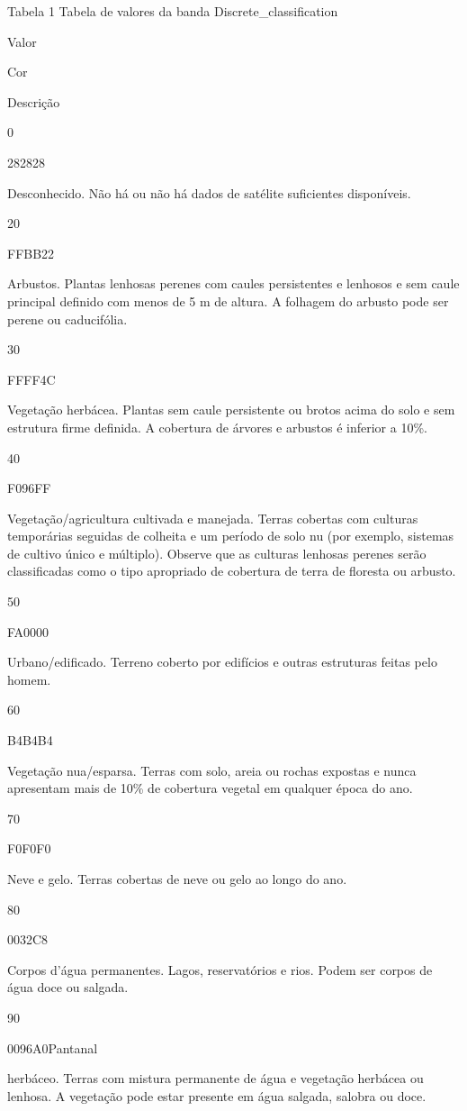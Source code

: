 \documentclass[
  portuguese,
]{krantz}
\begin{document}
Tabela 1 Tabela de valores da banda Discrete\_classification

Valor

Cor

Descrição

0

282828

Desconhecido. Não há ou não há dados de satélite suficientes disponíveis.

20

FFBB22

Arbustos. Plantas lenhosas perenes com caules persistentes e lenhosos e sem caule principal definido com menos de 5 m de altura. A folhagem do arbusto pode ser perene ou caducifólia.

30

FFFF4C

Vegetação herbácea. Plantas sem caule persistente ou brotos acima do solo e sem estrutura firme definida. A cobertura de árvores e arbustos é inferior a 10\%.

40

F096FF

Vegetação/agricultura cultivada e manejada. Terras cobertas com culturas temporárias seguidas de colheita e um período de solo nu (por exemplo, sistemas de cultivo único e múltiplo). Observe que as culturas lenhosas perenes serão classificadas como o tipo apropriado de cobertura de terra de floresta ou arbusto.

50

FA0000

Urbano/edificado. Terreno coberto por edifícios e outras estruturas feitas pelo homem.

60

B4B4B4

Vegetação nua/esparsa. Terras com solo, areia ou rochas expostas e nunca apresentam mais de 10\% de cobertura vegetal em qualquer época do ano.

70

F0F0F0

Neve e gelo. Terras cobertas de neve ou gelo ao longo do ano.

80

0032C8

Corpos d'água permanentes. Lagos, reservatórios e rios. Podem ser corpos de água doce ou salgada.

90

0096A0Pantanal

herbáceo. Terras com mistura permanente de água e vegetação herbácea ou lenhosa. A vegetação pode estar presente em água salgada, salobra ou doce.
\end{document}
